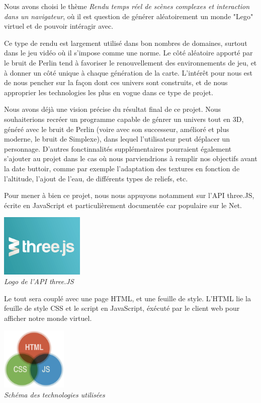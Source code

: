 Nous avons choisi le thème \textit{Rendu temps réel de scènes complexes et interaction dans un navigateur}, où il est question de générer aléatoirement un monde "Lego" virtuel et de pouvoir intéragir avec. 

Ce type de rendu est largement utilisé dans bon nombres de domaines, surtout dans le jeu vidéo où il s'impose comme une norme. Le côté aléatoire apporté par le bruit de Perlin tend à favoriser le renouvellement des environnements de jeu, et à donner un côté unique à chaque génération de la carte. L'intérêt pour nous est de nous pencher sur la façon dont ces univers sont construits, et de nous approprier les technologies les plus en vogue dans ce type de projet.

Nous avons déjà une vision précise du résultat final de ce projet. Nous souhaiterions recréer un programme capable de génrer un univers tout en 3D, généré avec le bruit de Perlin (voire avec son successeur, amélioré et plus moderne, le bruit de Simplexe), dans lequel l'utilisateur peut déplacer un personnage. D'autres fonctinnalités supplémentaires pourraient également s'ajouter au projet dans le cas où nous parviendrions à remplir nos objectifs avant la date buttoir, comme par exemple l'adaptation des textures en fonction de l'altitude, l'ajout de l'eau, de différents types de reliefs, etc. 

Pour mener à bien ce projet, nous nous appuyons notamment sur l'API three.JS, écrite en JavaScript et particulièrement documentée car populaire sur le Net.

\begin{center}
	\null\vspace{0.25cm}
	\includegraphics[height=3cm]{images/logo_threeJS.png}\\
	\textit{Logo de l'API three.JS}\\
\end{center}

\newpage
Le tout sera couplé avec une page HTML, et une feuille de style. L'HTML lie la feuille de style CSS et le script en JavaScript, éxécuté par le client web pour afficher notre monde virtuel.


\begin{center}
	\null\vspace{0.25cm}
	\includegraphics[height=3cm]{images/HTML_CSS_JS.png}\\
	\textit{Schéma des technologies utilisées}\\
\end{center}

